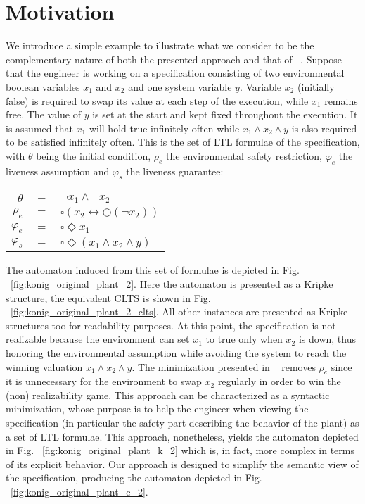 \clearpage
\section{Motivation}\label{sec:motivation}

We introduce a simple example to illustrate what we consider to be the complementary nature 
of both the presented approach and that of ~\cite{DBLP:conf/hvc/KonighoferHB10}. Suppose that the engineer is working on a specification consisting of two environmental boolean variables $x_1$ and $x_2$ and one system variable $y$. Variable $x_2$ (initially false) is required to swap its value at each step of the execution, while $x_1$ remains free. The value of $y$ is set at the start and kept fixed throughout the execution.
It is assumed that $x_1$ will hold true infinitely often while $x_1 \wedge x_2 \wedge y$ is also required to be satisfied infinitely often. This is the set of LTL formulae of the specification, with $\theta$ being the initial condition, $\rho_e$ the environmental safety restriction, $\varphi_e$ the liveness assumption and $\varphi_s$ the liveness guarantee:
\begin{center}
	\begin{tabular}{ r c l }
		$\theta$& $=$ &$\neg x_1 \wedge \neg x_2$\\
		$\rho_e$& $=$ &$\square(x_2 \leftrightarrow \bigcirc(\neg x_2))$\\
		$\varphi_e$& $=$ &$\square \Diamond x_1$\\
		$\varphi_s$& $=$ &$\square \Diamond (x_1 \wedge x_2 \wedge y)$\\
	\end{tabular}
\end{center}

The automaton induced from this set of formulae is depicted in Fig. ~\ref{fig:konig_original_plant_2}. Here the automaton is presented as a Kripke structure, the equivalent CLTS is shown in Fig. ~\ref{fig:konig_original_plant_2_clts}. All other instances are presented as Kripke structures too for readability purposes. At this point, the specification is not realizable because the environment can set $x_1$ to true only when $x_2$ is down, thus honoring the environmental assumption while avoiding the system to reach the winning valuation $x_1 \wedge x_2 \wedge y$. The minimization presented in ~\cite{DBLP:conf/hvc/KonighoferHB10} removes $\rho_e$ since it is unnecessary for the environment to swap $x_2$ regularly in order to win the (non) realizability game. This approach can be characterized as a syntactic minimization, whose purpose is to help the engineer when viewing the specification (in particular the safety part describing the behavior of the plant) as a set of LTL formulae. This approach, nonetheless, yields the automaton depicted in Fig. ~\ref{fig:konig_original_plant_k_2} which is, in fact, more complex in terms of its explicit behavior. Our approach is designed to simplify the semantic view of the specification, producing the automaton depicted in Fig. ~\ref{fig:konig_original_plant_c_2}. 

